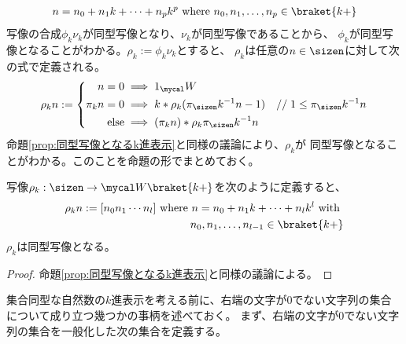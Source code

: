 	\begin{equation*}\begin{split}
		n = n_0 + n_1k + \cdots + n_pk^p
		\text{ where }n_0,n_1,\dots,n_p\in\braket{k+}
	\end{split}\end{equation*}
	写像の合成$\phi_k\nu_k$が同型写像となり、$\nu_k$が同型写像であることから、
	$\phi_k$が同型写像となることがわかる。$\rho_k:=\phi_k\nu_k$とすると、
	$\rho_k$は任意の$n\in\sizen$に対して次の式で定義される。
	\begin{equation*}\begin{split}
		\rho_k n := \left\{\begin{split}
			n = 0 &\implies 1_\Word \\
			\pi_kn = 0 &\implies k * \rho_k(\pi_\sizen k^{-1}n - 1)
				\quad //\; 1\le \pi_\sizen k^{-1}n  \\
			\text{else} &\implies (\pi_kn) * \rho_k\pi_\sizen k^{-1}n \\
		\end{split}\right. %
	\end{split}\end{equation*}
	命題\ref{prop:同型写像となるk進表示}と同様の議論により、$\rho_k$が
	同型写像となることがわかる。このことを命題の形でまとめておく。

	\begin{proposition}[同型写像となるk進表示その二]
	\label{prop:同型写像となるk進表示その二} %
		写像$\rho_k:\sizen\to\Word\braket{k+}$を次のように定義すると、
		\begin{equation*}\begin{split}
			\rho_k n := [n_0n_1\cdots n_l] \text{ where }
			n = n_0 + n_1k + \cdots + n_lk^l \text{ with } \\
			n_0,n_1,\dots,n_{l-1}\in\braket{k+}
		\end{split}\end{equation*}
		$\rho_k$は同型写像となる。
	\end{proposition} %
	\begin{proof} 命題\ref{prop:同型写像となるk進表示}と同様の議論による。
	\end{proof}

	\begin{todo}[ここまで]\label{todo:ここまで} %
	\end{todo} %

	集合同型な自然数の$k$進表示を考える前に、右端の文字が$0$でない文字列の集合
	について成り立つ幾つかの事柄を述べておく。
	まず、右端の文字が$0$でない文字列の集合を一般化した次の集合を定義する。

